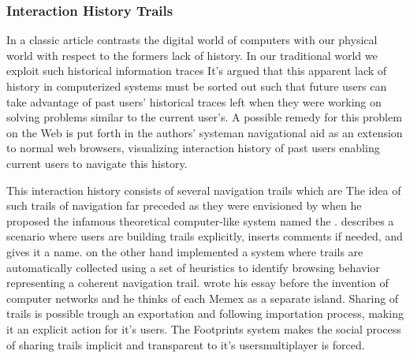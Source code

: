 \subsubsection{Interaction History Trails}
\label{section:background.social.navigation.applied.forms.interaction.history}

In a classic article \citet{wexelblat99} contrasts the digital world of
computers with our physical world with respect to the formers lack of history.
In our traditional world we exploit such historical information traces
It's argued that this apparent lack of history in computerized systems must
be sorted out such that future users can take advantage
of past users' historical traces left when they were working
on solving problems similar to the current user's.
A possible remedy for this problem on the Web is put forth in the authors'
 system\dash{}an navigational aid as an extension to
normal web browsers, visualizing interaction history of past users enabling
current users to navigate this history.

This interaction history consists of several navigation trails which are
The idea of such trails of navigation far preceded \citeauthor{wexelblat99}
as they were envisioned by \citet{bush45} when he proposed the infamous
theoretical computer-like system named the %
.
\citeauthor{bush45} describes a scenario where users are building trails
explicitly, inserts comments if needed, and gives it a name.
\citeauthor{wexelblat99} on the other hand
implemented a system where trails are automatically collected using a set of
heuristics to identify browsing behavior representing a coherent navigation
trail.
\citeauthor{bush45} wrote his essay before the invention of computer networks
and he thinks of each Memex as a separate island. Sharing of trails is
possible trough an exportation and following importation process, making it an
explicit action for it's users.
The Footprints system makes the social process of sharing trails implicit and
transparent to it's users\dash{}multiplayer is forced.

